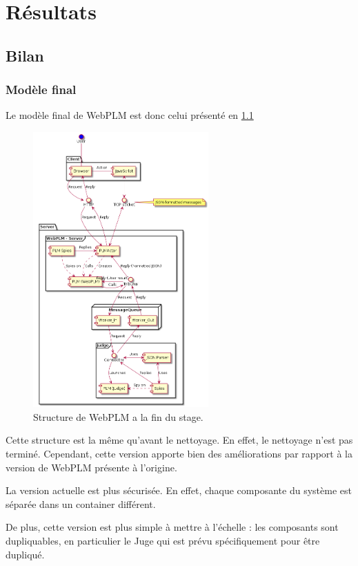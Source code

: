 \documentclass[stage]{tnreport}
\begin{document}
\chapter{Résultats}

\section{Bilan}

\subsection{Modèle final}

Le modèle final de WebPLM est donc celui présenté en \ref{fig:wplmUP5}
\begin{figure}[h]
	\centering
		\includegraphics[width=0.6\textwidth]{figures/WebPLM-uml-cp3}
	\caption{Structure de WebPLM a la fin du stage.}
	\label{fig:wplmUP5}
\end{figure}

Cette structure est la même qu'avant le nettoyage. En effet, le nettoyage n'est pas terminé. Cependant, cette version apporte bien des améliorations par rapport à la version de WebPLM présente à l'origine.

La version actuelle est plus sécurisée. En effet, chaque composante du système est séparée dans un container différent.

De plus, cette version est plus simple à mettre à l'échelle : les composants sont dupliquables, en particulier le Juge qui est prévu spécifiquement pour être dupliqué.
\end{document}
